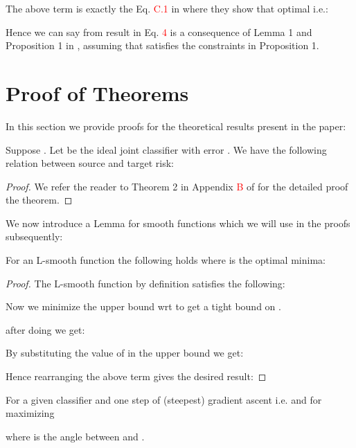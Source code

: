 \documentclass[table,dvipsnames]{article}
\theoremstyle{plain}
\theoremstyle{definition}
\theoremstyle{remark}
\begin{document}
The above term is exactly the Eq. \textcolor{red}{C.1} in \citet{acuna2021f} where they show that optimal  i.e.:

Hence we can say from result in Eq. \textcolor{red}{4} is a consequence of Lemma 1 and Proposition 1 in \citep{acuna2021f}, assuming that  satisfies the constraints in Proposition 1.

\section{Proof of Theorems}\label{app:proof}
In this section we provide proofs for the theoretical results present in the paper:
\setcounter{theorem}{0}
\begin{theorem}
\label{th:gen-bound}
Suppose . Let  be the ideal joint classifier with error . We have the following relation between source and target risk:

\end{theorem}
\begin{proof}
We refer the reader to Theorem 2 in Appendix \textcolor{red}{B} of \citet{acuna2021f} for the detailed proof the theorem.
\end{proof}
We now introduce a Lemma for smooth functions which we will use in the proofs subsequently:
\setcounter{theorem}{0}
\begin{lemma}
\label{lem:lsmooth}
For an L-smooth function  the following holds where  is the optimal minima:

\end{lemma}
\begin{proof}
The L-smooth function by definition satisfies the following:

Now we minimize the upper bound wrt  to get a tight bound on .

after doing  we get:

By substituting the value of  in the upper bound we get:

Hence rearranging the above term gives the desired result:


\end{proof}

\setcounter{theorem}{1}
\begin{theorem}
\label{th:suboptimality}
For a given classifier  and one step of (steepest) gradient ascent i.e.  and  for maximizing

where  is the angle between  and . 
\end{theorem}
\end{document}
